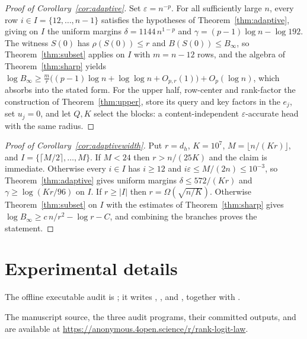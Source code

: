 \documentclass[10pt]{article}
\theoremstyle{definition}
\begin{document}
\begin{proof}[Proof of Corollary~\ref{cor:adaptive}]
Set \(\varepsilon=n^{-p}\).  For all sufficiently large \(n\), every row
\(i\in I=\{12,\ldots,n-1\}\) satisfies the hypotheses of
Theorem~\ref{thm:adaptive}, giving on \(I\) the uniform margins
\(\delta=1144\,n^{1-p}\) and
\(\gamma=(p-1)\log n-\log192\).  The witness \(S(0)\) has
\(\rho(S(0))\le r\) and \(B(S(0))\le B_\infty\), so
Theorem~\ref{thm:subset} applies on \(I\) with \(m=n-12\) rows, and the
algebra of Theorem~\ref{thm:sharp} yields
\(\log B_\infty\ge\frac{m}{r}\bigl((p-1)\log n+\log\log n+O_{p,r}(1)\bigr)
+O_p(\log n)\), which absorbs into the stated form.  For the upper half,
row-center and rank-factor the construction of Theorem~\ref{thm:upper},
store its query and key factors in the \(e_j\), set \(u_j=0\), and let
\(Q,K\) select the blocks: a content-independent \(\varepsilon\)-accurate
head with the same radius.
\end{proof}

\begin{proof}[Proof of Corollary~\ref{cor:adaptivewidth}]
Put \(r=d_h\), \(K=10^{7}\), \(M=\lfloor n/(Kr)\rfloor\), and
\(I=\{\lceil M/2\rceil,\ldots,M\}\).  If \(M<24\) then \(r>n/(25K)\) and
the claim is immediate.  Otherwise every \(i\in I\) has \(i\ge12\) and
\(i\varepsilon\le M/(2n)\le10^{-3}\), so Theorem~\ref{thm:adaptive} gives
uniform margins \(\delta\le572/(Kr)\) and \(\gamma\ge\log(Kr/96)\) on
\(I\).  If \(r\ge|I|\) then \(r=\Omega(\sqrt{n/K})\).  Otherwise
Theorem~\ref{thm:subset} on \(I\) with the estimates of
Theorem~\ref{thm:sharp} gives
\(\log B_\infty\ge c\,n/r^{2}-\log r-C\), and combining the branches proves
the statement.
\end{proof}

\section{Experimental details}\label{app:experiment}

{\scriptsize\raggedright
The offline executable audit is
; it writes
,
, and
, together with
.\par}

The manuscript source, the three audit programs, their committed outputs,
and  are available at
\url{https://anonymous.4open.science/r/rank-logit-law}.
\end{document}
